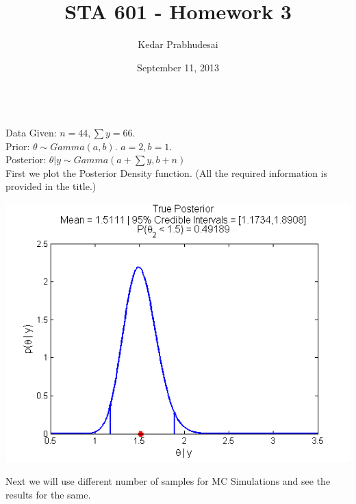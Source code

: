 \documentclass{article}
\title{STA 601 - Homework 3}
\author{Kedar Prabhudesai}
\date{September 11, 2013}
\begin{document}
\maketitle

\\

\indent Data Given: $n = 44, \sum{y} = 66.$\\

\indent Prior: $\theta \sim Gamma(a,b).$ $a = 2, b = 1.$\\

\indent Posterior: $\theta|y \sim Gamma(a+\sum{y},b+n)$\\

\noindent First we plot the Posterior Density function. (All the required information is provided in the title.) \\

\begin{center}
\includegraphics[scale=0.75]{Posterior.png}
\end{center}

\pagebreak

\noindent Next we will use different number of samples for MC Simulations and see the results for the same.\\
\end{document}
